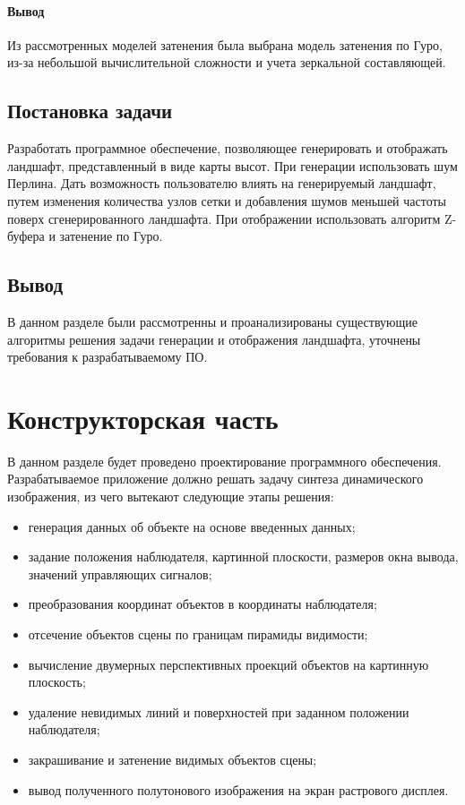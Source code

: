 \documentclass{article}
\begin{document}
	\paragraph{Вывод}
	\indent Из рассмотренных моделей затенения была выбрана модель затенения по Гуро, из-за небольшой вычислительной сложности и учета зеркальной составляющей.

	\subsection{Постановка задачи}
	\indent Разработать программное обеспечение, позволяющее генерировать и отображать ландшафт, представленный в виде карты высот. При генерации использовать шум Перлина. Дать возможность пользователю влиять на генерируемый ландшафт, путем изменения количества узлов сетки и добавления шумов меньшей частоты поверх сгенерированного ландшафта. При отображении использовать алгоритм Z-буфера и затенение по Гуро.
	\subsection{Вывод}
	\indent В данном разделе были рассмотренны и проанализированы существующие алгоритмы решения задачи генерации и отображения ландшафта, уточнены требования к разрабатываемому ПО.
	\newpage
	\section{Конструкторская часть}
	\indent В данном разделе будет проведено проектирование программного обеспечения.
	\\ \indent Разрабатываемое приложение должно решать задачу синтеза динамического изображения, из чего вытекают следующие этапы решения:
	\begin{itemize}
		\item генерация данных об объекте на основе введенных данных;
		\item задание положения наблюдателя, картинной плоскости, размеров окна вывода, значений управляющих сигналов;
		\item преобразования координат объектов в координаты наблюдателя;
		\item отсечение объектов сцены по границам пирамиды видимости;
		\item вычисление двумерных перспективных проекций объектов на картинную плоскость;
		\item удаление невидимых линий и поверхностей при заданном положении наблюдателя;
		\item закрашивание и затенение видимых объектов сцены;
		\item вывод полученного полутонового изображения на экран растрового дисплея.
	\end{itemize}
\end{document}
